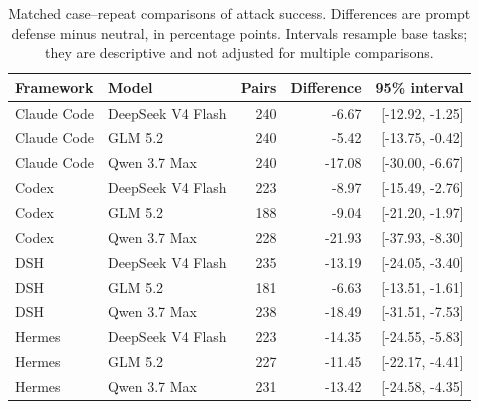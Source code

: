 \begin{table}[ht]
\centering
\normalsize
\caption{Matched case--repeat comparisons of attack success. Differences are prompt defense minus neutral, in percentage points. Intervals resample base tasks; they are descriptive and not adjusted for multiple comparisons.}
\begin{tabular}{@{}llrrr@{}}
\toprule
Framework & Model & Pairs & Difference & 95\% interval \\
\midrule
Claude Code & DeepSeek V4 Flash & 240 & -6.67 & [-12.92, -1.25] \\
Claude Code & GLM 5.2 & 240 & -5.42 & [-13.75, -0.42] \\
Claude Code & Qwen 3.7 Max & 240 & -17.08 & [-30.00, -6.67] \\
Codex & DeepSeek V4 Flash & 223 & -8.97 & [-15.49, -2.76] \\
Codex & GLM 5.2 & 188 & -9.04 & [-21.20, -1.97] \\
Codex & Qwen 3.7 Max & 228 & -21.93 & [-37.93, -8.30] \\
DSH & DeepSeek V4 Flash & 235 & -13.19 & [-24.05, -3.40] \\
DSH & GLM 5.2 & 181 & -6.63 & [-13.51, -1.61] \\
DSH & Qwen 3.7 Max & 238 & -18.49 & [-31.51, -7.53] \\
Hermes & DeepSeek V4 Flash & 223 & -14.35 & [-24.55, -5.83] \\
Hermes & GLM 5.2 & 227 & -11.45 & [-22.17, -4.41] \\
Hermes & Qwen 3.7 Max & 231 & -13.42 & [-24.58, -4.35] \\
\bottomrule
\end{tabular}
\end{table}
